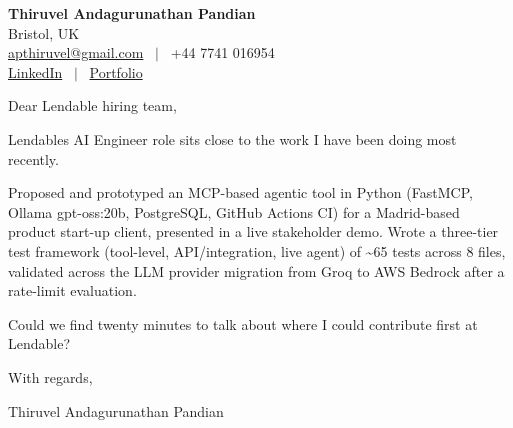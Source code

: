 \documentclass[11pt,a4paper]{article}
\begin{document}
\raggedright
\pagestyle{empty}

\begin{center}
    {\LARGE \color{linkblue} \textbf{Thiruvel Andagurunathan Pandian}}\\[0.2cm]
    Bristol, UK \\
    \href{mailto:apthiruvel@gmail.com}{apthiruvel@gmail.com} \ $|$ \ +44 7741 016954 \\
\href{https://www.linkedin.com/in/thiruvel-a-p/}{LinkedIn} \ $|$ \ \href{https://thiruvel-ap.github.io/PersonalPortfolio/}{Portfolio}
\end{center}

\vspace{0.4cm}

\noindent
Dear Lendable hiring team,

Lendable\textquotesingle{}s AI Engineer role sits close to the work I have been doing most recently.

Proposed and prototyped an MCP-based agentic tool in Python (FastMCP, Ollama gpt-oss:20b, PostgreSQL, GitHub Actions CI) for a Madrid-based product start-up client, presented in a live stakeholder demo. Wrote a three-tier test framework (tool-level, API/integration, live agent) of \textasciitilde{}65 tests across 8 files, validated across the LLM provider migration from Groq to AWS Bedrock after a rate-limit evaluation.

Could we find twenty minutes to talk about where I could contribute first at Lendable?

\vspace{0.5cm}

With regards,

Thiruvel Andagurunathan Pandian
\end{document}
